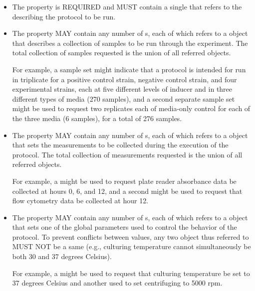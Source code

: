 \begin{itemize}
\item \label{sec:ER:instanceOf}
The  property is REQUIRED and MUST contain a single  that refers to the  describing the protocol to be run.

\item \label{sec:hasSampleSet}
The  property MAY contain any number of s, each of which refers to a  object that describes a collection of samples to be run through the experiment.
The total collection of samples requested is the union of all referred  objects.

For example, a sample set might indicate that a protocol is intended for run in triplicate for a positive control strain, negative control strain, and four experimental strains, each at five different levels of inducer and in three different types of media (270 samples), and a second separate sample set might be used to request two replicates each of media-only control for each of the three media (6 samples), for a total of 276 samples.

\item \label{sec:hasMeasurement}
The  property MAY contain any number of s, each of which refers to a  object that sets the measurements to be collected during the execution of the protocol.
The total collection of measurements requested is the union of all referred  objects.

For example, a  might be used to request plate reader absorbance data be collected at hours 0, 6, and 12, and a second  might be used to request that flow cytometry data be collected at hour 12.

\item \label{sec:hasParameterValue}
The  property MAY contain any number of s, each of which refers to a  object that sets one of the global parameters used to control the behavior of the protocol. 
To prevent conflicts between values, any two  object thus referred to MUST NOT be a  same  (e.g., culturing temperature cannot simultaneously be both 30 and  37 degrees Celsius).

For example, a  might be used to request that culturing temperature be set to 37 degrees Celsius and another used to set centrifuging to 5000 rpm.

\end{itemize}



